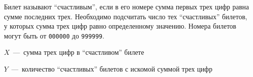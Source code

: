 Билет называют ``счастливым'', если в его номере сумма первых трех цифр равна сумме последних трех.
Необходимо подсчитать число тех ``счастливых'' билетов, у которых сумма трех цифр равно определенному значению.
Номера билетов могут быть от \texttt{000000} до \texttt{999999}.

\InputFile

$X$~---~сумма трех цифр в ``счастливом'' билете

\OutputFile

$Y$~---~количество ``счастливых'' билетов с искомой суммой трех цифр

\SAMPLES